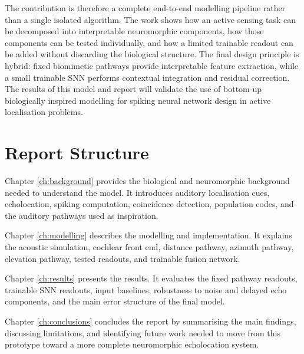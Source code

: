 The contribution is therefore a complete end-to-end modelling pipeline rather than a single isolated algorithm. The work shows how an active sensing task can be decomposed into interpretable neuromorphic components, how those components can be tested individually, and how a limited trainable readout can be added without discarding the biological structure. The final design principle is hybrid: fixed biomimetic pathways provide interpretable feature extraction, while a small trainable SNN performs contextual integration and residual correction. The results of this model and report will validate the use of bottom-up biologically inspired modelling for spiking neural network design in active localisation problems.

\section{Report Structure}

Chapter \ref{ch:background} provides the biological and neuromorphic background needed to understand the model. It introduces auditory localisation cues, echolocation, spiking computation, coincidence detection, population codes, and the auditory pathways used as inspiration.

Chapter \ref{ch:modelling} describes the modelling and implementation. It explains the acoustic simulation, cochlear front end, distance pathway, azimuth pathway, elevation pathway, tested readouts, and trainable fusion network.

Chapter \ref{ch:results} presents the results. It evaluates the fixed pathway readouts, trainable SNN readouts, input baselines, robustness to noise and delayed echo components, and the main error structure of the final model.

Chapter \ref{ch:conclusions} concludes the report by summarising the main findings, discussing limitations, and identifying future work needed to move from this prototype toward a more complete neuromorphic echolocation system.
